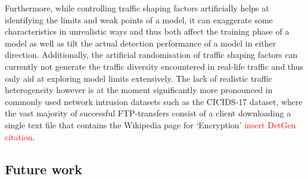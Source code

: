 \documentclass[conference]{IEEEtran}
\begin{document}
Furthermore, while controlling traffic shaping factors artificially helps at identifying the limits and weak points of a model, it can exaggerate some characteristics in unrealistic ways and thus both affect the training phase of a model as well as tilt the actual detection performance of a model in either direction. Additionally, the artificial randomisation of traffic shaping factors can currently not generate the traffic diversity encountered in real-life traffic and thus only aid at exploring model limits extensively. The lack of realistic traffic heterogeneity however is at the moment significantly more pronounced in commonly used network intrusion datasets such as the CICIDS-17 dataset, where the vast majority of successful FTP-transfers consist of a client downloading a single text file that contains the Wikipedia page for ‘Encryption’ \textcolor{red}{insert DetGen citation}.





\subsection{Future work}
\end{document}
